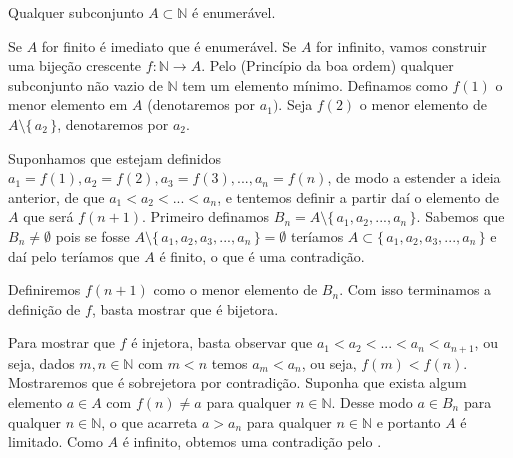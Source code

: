 \documentclass[../main.tex]{subfiles}
\begin{document}
\begin{teo}\label{enum-teo-subconjuntoNEnumeravel}
    Qualquer subconjunto $A \subset \mathbb{N}$ é enumerável.
\end{teo}
\begin{dem}
    Se $A$ for finito é imediato que é enumerável. Se $A$ for infinito, vamos construir uma bijeção crescente  $f \colon \mathbb{N} \to A$.
    Pelo  (Princípio da boa ordem) qualquer subconjunto não vazio de $\mathbb{N}$ tem um elemento mínimo. Definamos como $f(1)$ o menor elemento em $A$ (denotaremos por $a_1)$. Seja $f(2)$ o menor elemento de $A \setminus \{\,a_2\,\}$, denotaremos por $a_2$. 
    
    Suponhamos que estejam definidos $a_1 = f(1), a_2=f(2), a_3=f(3), ..., a_n=f(n)$, de modo a estender a ideia anterior, de que $a_1 < a_2 < ... < a_n$, e tentemos definir a partir daí o elemento de $A$ que será $f(n+1)$. Primeiro definamos $B_n = A \setminus \{\,a_1,a_2,...,a_n\,\}$. Sabemos que $B_n \neq \emptyset$ pois se fosse $A \setminus \{\,a_1,a_2,a_3,...,a_n\,\} = \emptyset$ teríamos $A \subset \{\,a_1,a_2,a_3,...,a_n\,\}$ e daí pelo  teríamos que $A$ é finito, o que é uma contradição.

    Definiremos $f(n+1)$ como o menor elemento de $B_n$. Com isso terminamos a definição de $f$, basta mostrar que é bijetora.

    Para mostrar que $f$ é injetora, basta observar que $a_1 < a_2 < ... < a_n < a_{n+1}$, ou seja, dados $m,n \in \mathbb{N}$ com $m < n$ temos $a_m < a_n$, ou seja, $f(m) < f(n)$. 
    Mostraremos que é sobrejetora por contradição. Suponha que exista algum elemento $a \in A$ com $f(n) \neq a$ para qualquer $n \in \mathbb{N}$.
    Desse modo $a \in B_n$ para qualquer $n \in \mathbb{N}$, o que acarreta $a > a_n $ para qualquer $n \in \mathbb{N}$ e portanto $A$ é limitado. Como $A$ é infinito, obtemos uma contradição pelo .
\end{dem}
\end{document}
